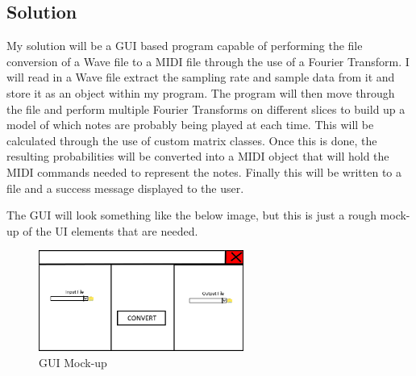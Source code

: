 \documentclass[12pt]{report}
\begin{document}
\subsection*{Solution}
My solution will be a GUI based program capable of performing the file conversion of a Wave file to a MIDI file through the use of a Fourier Transform. I will read in a Wave file extract the sampling rate and sample data from it and store it as an object within my program. The program will then move through the file and perform multiple Fourier Transforms on different slices to build up a model of which notes are probably being played at each time. This will be calculated through the use of custom matrix classes. Once this is done, the resulting probabilities will be converted into a MIDI object that will hold the MIDI commands needed to represent the notes. Finally this will be written to a file and a success message displayed to the user.

The GUI will look something like the below image, but this is just a rough mock-up of the UI elements that are needed.

\begin{figure}[H]
	\centering
	\includegraphics[width=0.6\textwidth]{mockup.png}
	\caption{GUI Mock-up}
	\centering
	\label{label:mockup}
\end{figure}
\end{document}
